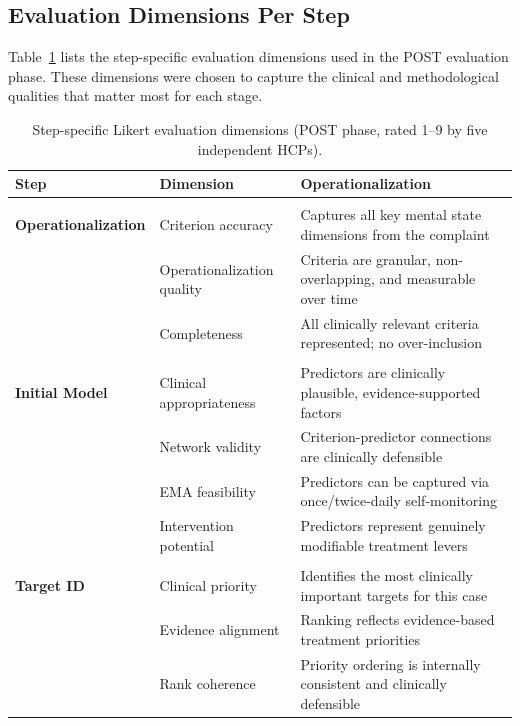\documentclass[11pt,a4paper]{article}
\begin{document}
\subsection{Evaluation Dimensions Per Step}

Table~\ref{tab:eval_dimensions} lists the step-specific evaluation dimensions used in the POST evaluation phase. These dimensions were chosen to capture the clinical and methodological qualities that matter most for each stage.

\begin{table}[H]
\centering
\caption{Step-specific Likert evaluation dimensions (POST phase, rated 1--9 by five independent HCPs).}
\label{tab:eval_dimensions}
\renewcommand{\arraystretch}{1.30}
\small
\begin{tabularx}{\textwidth}{@{}>{\bfseries}p{}p{}X@{}}
\toprule
\textbf{Step} & \textbf{Dimension} & \textbf{Operationalization} \\
\midrule
\multirow{3}{=}{\color{PhoenixBlue}Step 01\\Operationalization}
 & Criterion accuracy            & Captures all key mental state dimensions from the complaint \\
 & Operationalization quality    & Criteria are granular, non-overlapping, and measurable over time \\
 & Completeness                  & All clinically relevant criteria represented; no over-inclusion \\
\midrule
\multirow{4}{=}{\color{PhoenixGreen}Step 02\\Initial Model}
 & Clinical appropriateness     & Predictors are clinically plausible, evidence-supported factors \\
 & Network validity             & Criterion-predictor connections are clinically defensible \\
 & EMA feasibility              & Predictors can be captured via once/twice-daily self-monitoring \\
 & Intervention potential       & Predictors represent genuinely modifiable treatment levers \\
\midrule
\multirow{3}{=}{\color{PhoenixAmber}Step 03\\Target ID}
 & Clinical priority            & Identifies the most clinically important targets for this case \\
 & Evidence alignment           & Ranking reflects evidence-based treatment priorities \\
 & Rank coherence               & Priority ordering is internally consistent and clinically defensible \\

\end{tabularx}
\end{table}
\end{document}
